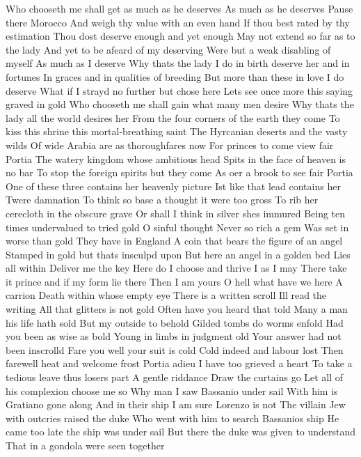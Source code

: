 Who chooseth me shall get as much as he deserves 
As much as he deserves Pause there Morocco 
And weigh thy value with an even hand 
If thou best rated by thy estimation 
Thou dost deserve enough and yet enough 
May not extend so far as to the lady 
And yet to be afeard of my deserving 
Were but a weak disabling of myself 
As much as I deserve Why thats the lady 
I do in birth deserve her and in fortunes 
In graces and in qualities of breeding 
But more than these in love I do deserve 
What if I strayd no further but chose here 
Lets see once more this saying graved in gold 
Who chooseth me shall gain what many men desire 
Why thats the lady all the world desires her 
From the four corners of the earth they come 
To kiss this shrine this mortal-breathing saint 
The Hyrcanian deserts and the vasty wilds 
Of wide Arabia are as thoroughfares now 
For princes to come view fair Portia 
The watery kingdom whose ambitious head 
Spits in the face of heaven is no bar 
To stop the foreign spirits but they come 
As oer a brook to see fair Portia 
One of these three contains her heavenly picture 
Ist like that lead contains her Twere damnation 
To think so base a thought it were too gross 
To rib her cerecloth in the obscure grave 
Or shall I think in silver shes immured 
Being ten times undervalued to tried gold 
O sinful thought Never so rich a gem 
Was set in worse than gold They have in England 
A coin that bears the figure of an angel 
Stamped in gold but thats insculpd upon 
But here an angel in a golden bed 
Lies all within Deliver me the key 
Here do I choose and thrive I as I may 
There take it prince and if my form lie there 
Then I am yours 
O hell what have we here 
A carrion Death within whose empty eye 
There is a written scroll Ill read the writing 
All that glitters is not gold 
Often have you heard that told 
Many a man his life hath sold 
But my outside to behold 
Gilded tombs do worms enfold 
Had you been as wise as bold 
Young in limbs in judgment old 
Your answer had not been inscrolld 
Fare you well your suit is cold 
Cold indeed and labour lost 
Then farewell heat and welcome frost 
Portia adieu I have too grieved a heart 
To take a tedious leave thus losers part 
A gentle riddance Draw the curtains go 
Let all of his complexion choose me so 
Why man I saw Bassanio under sail 
With him is Gratiano gone along 
And in their ship I am sure Lorenzo is not 
The villain Jew with outcries raised the duke 
Who went with him to search Bassanios ship 
He came too late the ship was under sail 
But there the duke was given to understand 
That in a gondola were seen together 

